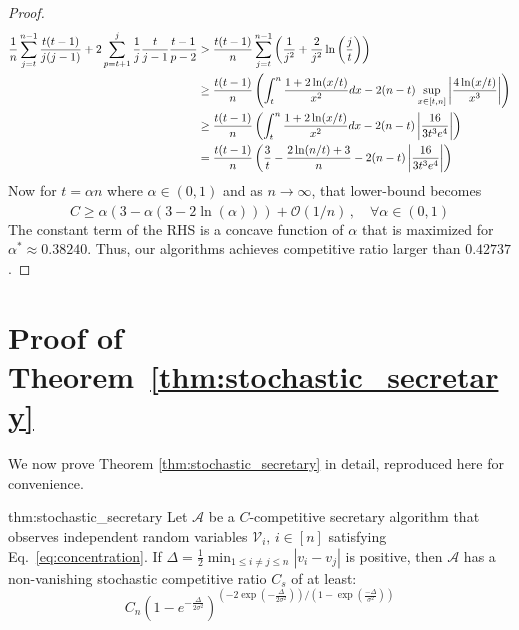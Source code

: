 \begin{proof}
\begin{align}
    \frac{1}{n} \sum_{j = t}^{n-1}\frac{t(t - 1)}{j (j - 1)} + 2 \sum_{p = t + 1}^{j}\frac{1}{j}\frac{t}{j - 1}\frac{t-1}{p-2} 
    & > \frac{t(t-1)}{n}\sum_{j = t}^{n-1}\left(\frac{1}{j^2} + \frac{2}{j^2}\ln\left(\frac{j}{t}\right)\right) \\
    & \geq \frac{t(t-1)}{n}\left(\int_{t}^{n}  \frac{1+2\ln(x/t)}{x^2} dx - 2(n-t) \sup_{x \in [t,n]} \left| 
    \frac{4 \ln(x/t)}{x ^3}\right| \right) \notag \\
    & \geq  \frac{t(t-1)}{n}\left(\int_{t}^{n}  \frac{1+2\ln(x/t)}{x^2} dx - 2(n-t) \left| \frac{16}{3 t^3 e^4} \right| \right) \notag \\
    & = 
    \frac{t(t -1)}{n} \left(\frac{3}{t}-\frac{2\ln(n/t) + 3}{n} - 2(n-t) \left| \frac{16}{3 t^3 e^4} \right|\right) 
\end{align}
Now for $t = \alpha n$ where $\alpha \in (0, 1)$ and as $n \xrightarrow[]{} \infty$, that lower-bound becomes 
\begin{equation}
C \geq \alpha (3 - \alpha(3 - 2\ln (\alpha))) + \mathcal{O}(1/n) \,,\quad \forall \alpha \in (0,1)
\end{equation}
The constant term of the RHS is a concave function of $\alpha$ that is maximized for $\alpha^* \approx 0.38240$. Thus, our algorithms achieves competitive ratio larger than $0.42737$.
\end{proof}


\clearpage



\section{Proof of Theorem~\ref{thm:stochastic_secretary}}
\label{appendix:proof_thm2}
We now prove Theorem \ref{thm:stochastic_secretary} in detail, reproduced here for convenience. 

\begin{reptheorem}{thm:stochastic_secretary}
Let $\mathcal{A}$ be a $C$-competitive secretary algorithm that observes independent random variables $\mathcal{V}_{i},\, i\in [n]$ satisfying Eq.~\ref{eq:concentration}. If $\Delta = \tfrac{1}{2}\min_{1\leq i \neq j \leq  n } |v_i - v_j|$ is positive, then $\mathcal{A}$ has a non-vanishing stochastic competitive ratio $C_{s}$ of at least:  
\begin{equation}
    C_n \left( 1-e^{- \frac{\Delta}{2 \sigma^2}} \right)^{\left(-2 \exp(- \frac{\Delta}{2 \sigma^2})\right)/\left({1 -  \exp(\frac{-\Delta}{\sigma^2})}\right)}
\end{equation}
\end{reptheorem}

